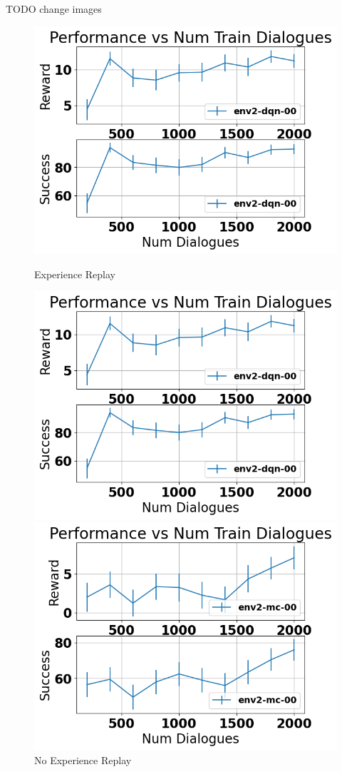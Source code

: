 \documentclass[12pt,titlepage,a4paper]{article}
\begin{document}
TODO change images
\begin{figure}[!htb]
      \includegraphics[width=\linewidth]{env2-CamRestaurants-experience.png}
      \caption{Experience Replay}
      \label{fig:ex}
      \endminipage\hfill
      \includegraphics[width=\linewidth]{env2-CamRestaurants-experience.png}
      \caption{No Experience Replay}
      \label{fig:no-ex}
      \endminipage\hfill
      \includegraphics[width=\linewidth]{env2-CamRestaurants-mc.png}

\end{figure}
\end{document}
